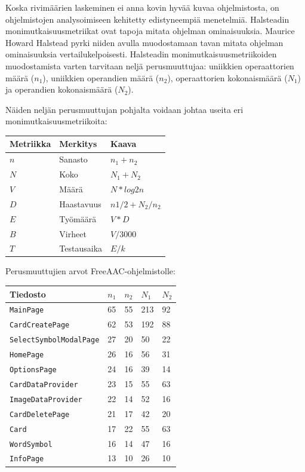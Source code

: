\documentclass[utf8]{gradu3}
\begin{document}
Koska rivimäärien laskeminen ei anna kovin hyvää kuvaa ohjelmistosta, on ohjelmistojen analysoimiseen kehitetty edistyneempiä menetelmiä. Halsteadin monimutkaisuusmetriikat ovat tapoja mitata ohjelman ominaisuuksia. Maurice Howard Halstead pyrki niiden avulla muodostamaan tavan mitata ohjelman ominaisuuksia vertailukelpoisesti. Halsteadin monimutkaisuusmetriikoiden muodostamista varten tarvitaan neljä perusmuuttujaa: uniikkien operaattorien määrä ($n_1$), uniikkien operandien määrä ($n_2$), operaattorien kokonaismäärä ($N_1$) ja operandien kokonaismäärä ($N_2$).

Näiden neljän perusmuuttujan pohjalta voidaan johtaa useita eri monimutkaisuusmetriikoita:

\begin{center}
    \begin{tabular}{ | l | l | l |}
    \hline
    \textbf{Metriikka} & \textbf{Merkitys} & \textbf{Kaava} \\ \hline
    $n$ & Sanasto & $n_1 + n_2$ \\ \hline
    $N$ & Koko & $N_1 + N_2$ \\ \hline
    $V$ & Määrä & $N * log2 n$ \\ \hline
    $D$ & Haastavuus & $n1/2 + N_2/n_2$ \\ \hline
    $E$ & Työmäärä & $V * D$ \\ \hline
    $B$ & Virheet & $V / 3000$ \\ \hline
    $T$ & Testausaika & $E / k$ \\ \hline
    \end{tabular}
\end{center}

Perusmuuttujien arvot FreeAAC-ohjelmistolle:

\begin{center}
    \begin{tabular}{| l | l | l | l | l |}
    \hline
    \textbf{Tiedosto} & \textbf{$n_1$} & \textbf{$n_2$} & \textbf{$N_1$} & \textbf{$N_2$} \\ \hline
    \texttt{MainPage} & 65 & 55 & 213 & 92 \\ \hline
    \texttt{CardCreatePage} & 62 & 53 & 192 & 88 \\ \hline
    \texttt{SelectSymbolModalPage} & 27 & 20 & 50 & 22 \\ \hline
    \texttt{HomePage} & 26 & 16 & 56 & 31 \\ \hline
    \texttt{OptionsPage} & 24 & 16 & 39 & 14 \\ \hline
    \texttt{CardDataProvider} & 23 & 15 & 55 & 63 \\ \hline
    \texttt{ImageDataProvider} & 22 & 14 & 52 & 16 \\ \hline
    \texttt{CardDeletePage} & 21 & 17 & 42 & 20 \\ \hline
    \texttt{Card} & 17 & 22 & 55 & 63 \\ \hline
    \texttt{WordSymbol} & 16 & 14 & 47 & 16 \\ \hline
    \texttt{InfoPage} & 13 & 10 & 26 & 10 \\ \hline
    \end{tabular}
\end{center}
\end{document}

